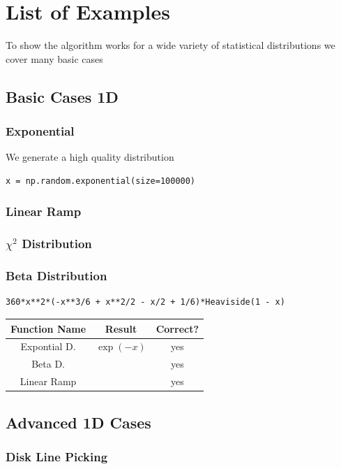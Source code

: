 \documentclass{article}
\begin{document}
\section{List of Examples}
To show the algorithm works for a wide variety of statistical distributions we cover many basic cases
\subsection{Basic Cases 1D}

\subsubsection{Exponential}
We generate a high quality distribution
\begin{verbatim}
x = np.random.exponential(size=100000)
\end{verbatim}

\subsubsection{Linear Ramp}

\subsubsection{$\chi^2$ Distribution}

\subsubsection{Beta Distribution}
\begin{verbatim}
360*x**2*(-x**3/6 + x**2/2 - x/2 + 1/6)*Heaviside(1 - x)
\end{verbatim}

\begin{tabular}{|c|c|c|}
\hline
Function Name & Result & Correct? \\
\hline
Expontial D. & $\exp(-x)$ & yes \\
Beta D. & & yes \\
Linear Ramp & & yes \\
\end{tabular}


\subsection{Advanced 1D Cases}

\subsubsection{Disk Line Picking}
\end{document}
